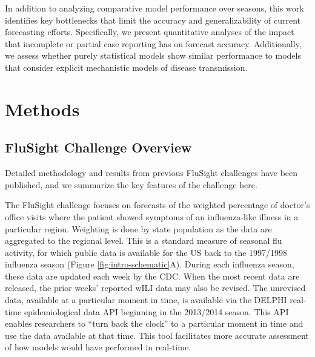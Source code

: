 \documentclass{article}\usepackage[]{graphicx}\usepackage[]{color}
\begin{document}
In addition to analyzing comparative model performance over seasons, this work identifies key bottlenecks that limit the accuracy and generalizability of current forecasting efforts.
Specifically, we present quantitative analyses of the impact that incomplete or partial case reporting has on forecast accuracy.
Additionally, we assess whether purely statistical models show similar performance to models that consider explicit mechanistic models of disease transmission.


\section{Methods}

\subsection{FluSight Challenge Overview}
 
Detailed methodology and results from previous FluSight challenges have been published\cite{Biggerstaff2016,Biggerstaff2018}, and we summarize the key features of the challenge here.

The FluSight challenge focuses on forecasts of the weighted percentage of doctor's office visits where the patient showed symptoms of an influenza-like illness in a particular region. Weighting is done by state population as the data are aggregated to the regional level.
This is a standard measure of seasonal flu activity, for which public data is available for the US back to the 1997/1998 influenza season (Figure \ref{fig:intro-schematic}A). 
During each influenza season, these data are updated each week by the CDC. When the most recent data are released, the prior weeks' reported wILI data may also be revised. 
The unrevised data, available at a particular moment in time, is available via the DELPHI real-time epidemiological data API beginning in the 2013/2014 season.\cite{DELPHI} 
This API enables researchers to ``turn back the clock'' to a particular moment in time and use the data available at that time. This tool facilitates more accurate assessment of how models would have performed in real-time. 
\end{document}
